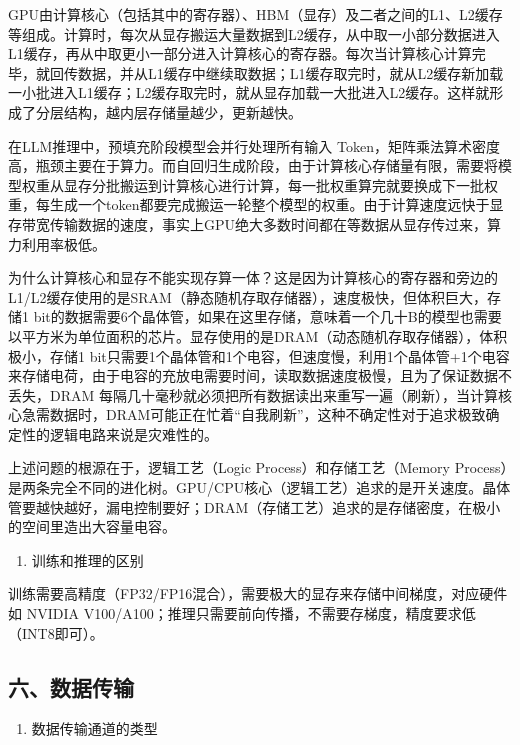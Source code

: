 GPU由计算核心（包括其中的寄存器）、HBM（显存）及二者之间的L1、L2缓存等组成。计算时，每次从显存搬运大量数据到L2缓存，从中取一小部分数据进入L1缓存，再从中取更小一部分进入计算核心的寄存器。每次当计算核心计算完毕，就回传数据，并从L1缓存中继续取数据；L1缓存取完时，就从L2缓存新加载一小批进入L1缓存；L2缓存取完时，就从显存加载一大批进入L2缓存。这样就形成了分层结构，越内层存储量越少，更新越快。

在LLM推理中，预填充阶段模型会并行处理所有输入 Token，矩阵乘法算术密度高，瓶颈主要在于算力。而自回归生成阶段，由于计算核心存储量有限，需要将模型权重从显存分批搬运到计算核心进行计算，每一批权重算完就要换成下一批权重，每生成一个token都要完成搬运一轮整个模型的权重。由于计算速度远快于显存带宽传输数据的速度，事实上GPU绝大多数时间都在等数据从显存传过来，算力利用率极低。

为什么计算核心和显存不能实现存算一体？这是因为计算核心的寄存器和旁边的L1/L2缓存使用的是SRAM（静态随机存取存储器），速度极快，但体积巨大，存储1 bit的数据需要6个晶体管，如果在这里存储，意味着一个几十B的模型也需要以平方米为单位面积的芯片。显存使用的是DRAM（动态随机存取存储器），体积极小，存储1 bit只需要1个晶体管和1个电容，但速度慢，利用1个晶体管+1个电容来存储电荷，由于电容的充放电需要时间，读取数据速度极慢，且为了保证数据不丢失，DRAM 每隔几十毫秒就必须把所有数据读出来重写一遍（刷新），当计算核心急需数据时，DRAM可能正在忙着``自我刷新''，这种不确定性对于追求极致确定性的逻辑电路来说是灾难性的。

上述问题的根源在于，逻辑工艺（Logic Process）和存储工艺（Memory Process）是两条完全不同的进化树。GPU/CPU核心（逻辑工艺）追求的是开关速度。晶体管要越快越好，漏电控制要好；DRAM（存储工艺）追求的是存储密度，在极小的空间里造出大容量电容。

\begin{enumerate}
\def\labelenumi{\arabic{enumi}.}
\setcounter{enumi}{2}
\tightlist
\item
  训练和推理的区别
\end{enumerate}

训练需要高精度（FP32/FP16混合），需要极大的显存来存储中间梯度，对应硬件如 NVIDIA V100/A100；推理只需要前向传播，不需要存梯度，精度要求低（INT8即可）。

\hypertarget{ux516dux6570ux636eux4f20ux8f93}{%
\subsection{六、数据传输}\label{ux516dux6570ux636eux4f20ux8f93}}

\begin{enumerate}
\def\labelenumi{\arabic{enumi}.}
\tightlist
\item
  数据传输通道的类型
\end{enumerate}


